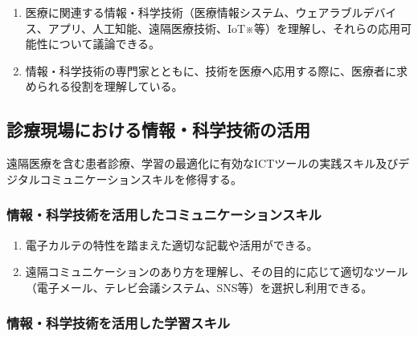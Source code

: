 \begin{enumerate}
\def\labelenumi{\arabic{enumi}.}
\tightlist
\item
  医療に関連する情報・科学技術（医療情報システム、ウェアラブルデバイス、アプリ、人工知能、遠隔医療技術、IoT※等）を理解し、それらの応用可能性について議論できる。
\item
  情報・科学技術の専門家とともに、技術を医療へ応用する際に、医療者に求められる役割を理解している。
\end{enumerate}

\hypertarget{ux8a3aux7642ux73feux5834ux306bux304aux3051ux308bux60c5ux5831ux79d1ux5b66ux6280ux8853ux306eux6d3bux7528}{%
\subsection{診療現場における情報・科学技術の活用}\label{ux8a3aux7642ux73feux5834ux306bux304aux3051ux308bux60c5ux5831ux79d1ux5b66ux6280ux8853ux306eux6d3bux7528}}

遠隔医療を含む患者診療、学習の最適化に有効なICTツールの実践スキル及びデジタルコミュニケーションスキルを修得する。

\hypertarget{ux60c5ux5831ux79d1ux5b66ux6280ux8853ux3092ux6d3bux7528ux3057ux305fux30b3ux30dfux30e5ux30cbux30b1ux30fcux30b7ux30e7ux30f3ux30b9ux30adux30eb}{%
\subsubsection{情報・科学技術を活用したコミュニケーションスキル}\label{ux60c5ux5831ux79d1ux5b66ux6280ux8853ux3092ux6d3bux7528ux3057ux305fux30b3ux30dfux30e5ux30cbux30b1ux30fcux30b7ux30e7ux30f3ux30b9ux30adux30eb}}

\begin{enumerate}
\def\labelenumi{\arabic{enumi}.}
\tightlist
\item
  電子カルテの特性を踏まえた適切な記載や活用ができる。
\item
  遠隔コミュニケーションのあり方を理解し、その目的に応じて適切なツール（電子メール、テレビ会議システム、SNS等）を選択し利用できる。
\end{enumerate}

\hypertarget{ux60c5ux5831ux79d1ux5b66ux6280ux8853ux3092ux6d3bux7528ux3057ux305fux5b66ux7fd2ux30b9ux30adux30eb}{%
\subsubsection{情報・科学技術を活用した学習スキル}\label{ux60c5ux5831ux79d1ux5b66ux6280ux8853ux3092ux6d3bux7528ux3057ux305fux5b66ux7fd2ux30b9ux30adux30eb}}

